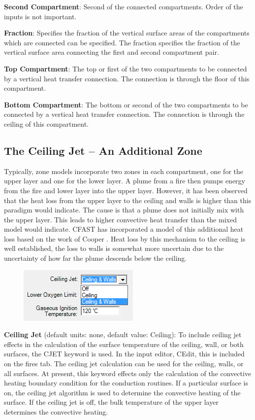 \textbf{Second Compartment}: Second of the connected compartments. Order of the inputs is not important.

\textbf{Fraction}: Specifies the fraction of the vertical surface areas of the compartments which are connected can be specified. The fraction specifies the fraction of the vertical surface area connecting the first and second compartment pair.

\textbf{Top Compartment}: The top or first of the two compartments to be connected by a vertical heat transfer connection. The connection is through the floor of this compartment.

\textbf{Bottom Compartment}: The bottom or second of the two compartments to be connected by a vertical heat transfer connection. The connection is through the ceiling of this compartment.

\subsection{The Ceiling Jet – An Additional Zone}

Typically, zone models incorporate two zones in each compartment, one for the upper layer and one for the lower layer. A plume from a fire then pumps energy from the fire and lower layer into the upper layer. However, it has been observed that the heat loss from the upper layer to the ceiling and walls is higher than this paradigm would indicate. The cause is that a plume does not initially mix with the upper layer. This leads to higher convective heat transfer than the mixed model would indicate. CFAST has incorporated a model of this additional heat loss based on the work of Cooper \cite{Cooper:1988} . Heat loss by this mechanism to the ceiling is well established, the loss to walls is somewhat more uncertain due to the uncertainty of how far the plume descends below the ceiling.

\begin{figure}
\includegraphics[width=2.313in]{FIGURES/Input_File/Ceiling_Jet}
\end{figure}

\textbf{Ceiling Jet} (default units: none, default value: Ceiling): To include ceiling jet effects in the calculation of the surface temperature of the ceiling, wall, or both surfaces, the CJET keyword is used.  In the input editor, CEdit, this is included on the fires tab. The ceiling jet calculation can be used for the ceiling, walls, or all surfaces. At present, this keyword effects only the calculation of the convective heating boundary condition for the conduction routines.  If a particular surface is on, the ceiling jet algorithm is used to determine the convective heating of the surface.  If the ceiling jet is off, the bulk temperature of the upper layer determines the convective heating.

